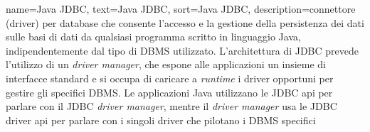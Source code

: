 {
	name=Java JDBC,
	text=Java JDBC,
	sort=Java JDBC,
	description={connettore (driver) per database che consente l'accesso e la gestione della persistenza dei dati sulle basi di dati da qualsiasi programma scritto in linguaggio Java, indipendentemente dal tipo di DBMS utilizzato. L'architettura di JDBC prevede l'utilizzo di un \textit{driver manager}, che espone alle applicazioni un insieme di interfacce standard e si occupa di caricare a \textit{runtime} i driver opportuni per gestire gli specifici DBMS. Le applicazioni Java utilizzano le JDBC \gls{api} per parlare con il JDBC \textit{driver manager}, mentre il \textit{driver manager} usa le JDBC driver \gls{api} per parlare con i singoli driver che pilotano i DBMS specifici}
}